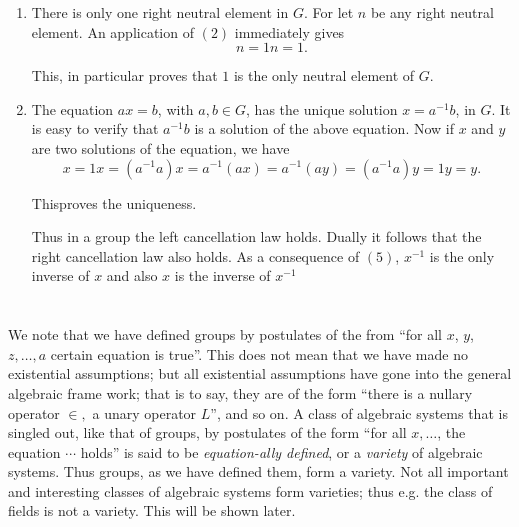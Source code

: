 \begin{enumerate}[(1)]
\begin{proof}
    Hence, $(x^{-1} x) 1=1$, 
    $$
    x^{-1} x = (x^{-1} x) 1=1.
    $$

    This proves (3).
  \end{proof}
  
  We say that 1 is a (two-sided) neutral element or unit element, now
  that it is both left neutral and right neutral. Similarly $x^{-1}$ is
  an inverse of $x$. 
  
  
\item There is only one right neutral element in $G$. For let $n$ be
  any right neutral element. An application of $(2)$ immediately gives 
  $$
  n = 1n = 1.
  $$
  
  This, in particular proves that $1$ is the only neutral element of $G$.
  
\item The equation $ax = b$, with $a, b \in G$, has the unique
  solution $x = a^{-1}b$, in $G$. It is easy to verify that $a^{-1}b$
  is a solution of the above equation. Now if $x$ and $y$ are two
  solutions of the equation, we have 
  $$
  x = 1x = (a^{-1}a) x = a^{-1} (ax) = a^{-1} (ay) = (a^{-1} a)y = 1y = y.
  $$

  This\pageoriginale proves the uniqueness. 
  
  Thus in a group the left cancellation law holds. Dually it follows
  that the right cancellation law also holds. As a consequence of
  $(5)$, $x^{-1}$ is the only inverse of $x$ and also $x$ is the
  inverse of $x^{-1}$ 
\end{enumerate}

\section{}\label{chap1:sec4} %

We note that we have defined groups by postulates of the from ``for
all $x$, $y$, $z,\ldots, a$ certain equation is true''. This does not
mean that we have made no existential assumptions; but all existential
assumptions have gone into the general algebraic frame work; that is
to say, they are of the form  ``there is a nullary operator
$\in , $ a unary operator $L$'', and so on. A class of algebraic
systems that is singled out, like that of groups, by postulates of the
form ``for all $x,\ldots$,  the equation $\cdots$ holds'' is said to be
\textit{equation-ally defined}, or a \textit{variety} of algebraic
systems. Thus groups, as we have defined them, form a variety. Not all
important and interesting classes of algebraic systems form varieties;
thus e.g. the class of fields is not a variety. This will be shown
later. 

